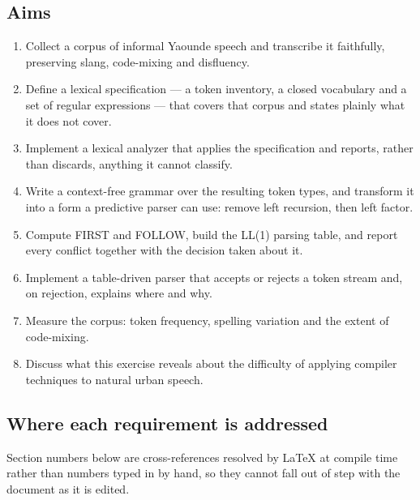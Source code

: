 \documentclass[11pt,a4paper]{article}
\begin{document}
\subsection{Aims}
\begin{enumerate}
\item Collect a corpus of informal Yaounde speech and transcribe it faithfully, preserving slang, code-mixing and disfluency.
\item Define a lexical specification --- a token inventory, a closed vocabulary and a set of regular expressions --- that covers that corpus and states plainly what it does not cover.
\item Implement a lexical analyzer that applies the specification and reports, rather than discards, anything it cannot classify.
\item Write a context-free grammar over the resulting token types, and transform it into a form a predictive parser can use: remove left recursion, then left factor.
\item Compute FIRST and FOLLOW, build the LL(1) parsing table, and report every conflict together with the decision taken about it.
\item Implement a table-driven parser that accepts or rejects a token stream and, on rejection, explains where and why.
\item Measure the corpus: token frequency, spelling variation and the extent of code-mixing.
\item Discuss what this exercise reveals about the difficulty of applying compiler techniques to natural urban speech.
\end{enumerate}

\subsection{Where each requirement is addressed}
Section numbers below are cross-references resolved by LaTeX at compile time rather than numbers typed in by hand, so they cannot fall out of step with the document as it is edited.
\end{document}

